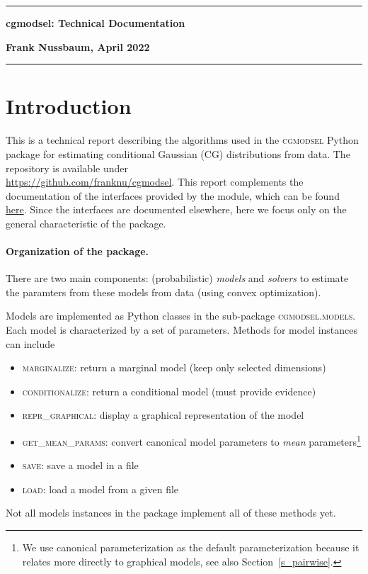 \documentclass{article}
\newcommand{\rulew} {\rule{\textwidth}{0.3pt}}
\newcommand{\us}{\_}
\begin{document}
\rule{\textwidth}{0.3pt}
\begin{center}
\textbf{\large cgmodsel: Technical Documentation}
\end{center}
\textbf{\hfill Frank Nussbaum, April 2022}

\rulew


\section{Introduction}

This is a technical report describing the algorithms used in the \textsc{cgmodsel} Python package for estimating conditional Gaussian (CG) distributions from data. 
The repository is available under \\
\href{https://github.com/franknu/cgmodsel}{https://github.com/franknu/cgmodsel}.
This report complements the documentation of the interfaces provided by the module, which can be found \href{https://franknu.github.io/cgmodsel-pages/source/modules.html}{here}. Since the interfaces are documented elsewhere, here we focus only on the general characteristic of the package.

\paragraph{Organization of the package.}
There are two main components: (probabilistic) \emph{models} and \emph{solvers} to estimate the paramters from these models from data (using convex optimization).

Models are implemented as Python classes in the sub-package \textsc{cgmodsel.models}. Each model is characterized by a set of parameters.
Methods for model instances can include
\begin{itemize}
 \item \textsc{marginalize}: return a marginal model (keep only selected dimensions)
  \item \textsc{conditionalize}: return a conditional model (must provide evidence)
 \item \textsc{repr\us graphical}: display a graphical representation of the model
 \item \textsc{get\us mean\us params}: convert canonical model parameters to \emph{mean} parameters\footnote{We use canonical parameterization as the default parameterization because it relates more directly to graphical models, see also Section~\ref{s_pairwise}.}
\item \textsc{save}: save a model in a file
\item \textsc{load}: load a model from a given file
\end{itemize}
Not all models instances in the package implement all of these methods yet.
\end{document}
